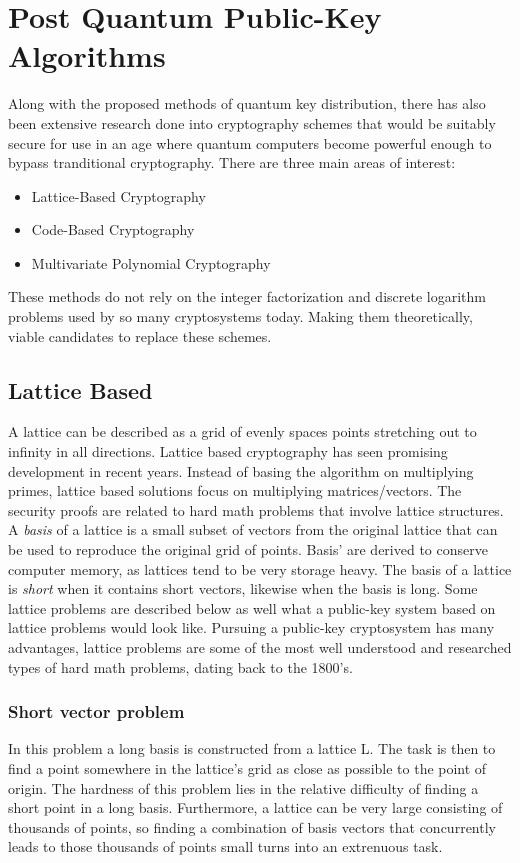 \documentclass[journal]{IEEEtran}
\begin{document}
\section{Post Quantum Public-Key Algorithms}
Along with the proposed methods of quantum key distribution, there has also been extensive research done into cryptography schemes that would be suitably secure for use in an age where quantum computers become powerful enough to bypass tranditional cryptography. There are three main areas of interest:
\begin{itemize}
  \item Lattice-Based Cryptography
  \item Code-Based Cryptography
  \item Multivariate Polynomial Cryptography
\end{itemize}
These methods do not rely on the integer factorization and discrete logarithm problems used by so many cryptosystems today. Making them theoretically, viable candidates to replace these schemes.

\subsection{Lattice Based}
A lattice can be described as a grid of evenly spaces points stretching out to infinity in all directions.
Lattice based cryptography has seen promising development in recent years. Instead of basing the algorithm on multiplying primes, lattice based solutions focus on multiplying matrices/vectors.
The security proofs are related to hard math problems that involve lattice structures. \\
A \emph{basis} of a lattice is a small subset of vectors from the original lattice that can be used to reproduce the original grid of points.
Basis' are derived to conserve computer memory, as lattices tend to be very storage heavy. The basis of a lattice is \emph{short} when it contains short vectors, likewise when the basis is long. Some lattice problems are described below
as well what a public-key system based on lattice problems would look like. Pursuing a public-key cryptosystem has many advantages, lattice problems are some of the most well understood and researched types of hard math problems, dating back
to the 1800's.
\subsubsection{Short vector problem}
In this problem a long basis is constructed from a lattice L. The task is then to find a point somewhere in the lattice's grid as close as possible to the point of origin.
The hardness of this problem lies in the relative difficulty of finding a short point in a long basis. Furthermore, a lattice can be very large consisting of thousands of points, so finding a combination of basis vectors that concurrently leads to those
thousands of points small turns into an extrenuous task. 
\end{document}
